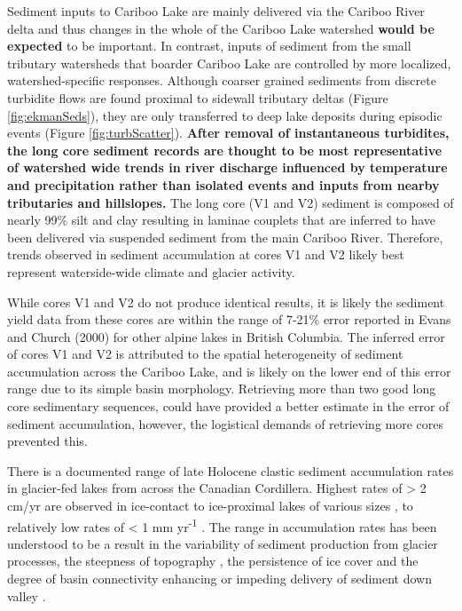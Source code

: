 \documentclass[Royal,times,doublespace,sageh]{sagej}
\begin{document}
Sediment inputs to Cariboo Lake are mainly delivered via the Cariboo
River delta and thus changes in the whole of the Cariboo Lake watershed
\textbf{would be expected} to be important. In contrast, inputs of
sediment from the small tributary watersheds that boarder Cariboo Lake
are controlled by more localized, watershed-specific responses. Although
coarser grained sediments from discrete turbidite flows are found
proximal to sidewall tributary deltas (Figure \ref{fig:ekmanSeds}), they
are only transferred to deep lake deposits during episodic events
(Figure \ref{fig:turbScatter}). \textbf{After removal of instantaneous
turbidites, the long core sediment records are thought to be most
representative of watershed wide trends in river discharge influenced by
temperature and precipitation rather than isolated events and inputs
from nearby tributaries and hillslopes.} The long core (V1 and V2)
sediment is composed of nearly 99\% silt and clay resulting in laminae
couplets that are inferred to have been delivered via suspended sediment
from the main Cariboo River. Therefore, trends observed in sediment
accumulation at cores V1 and V2 likely best represent waterside-wide
climate and glacier activity.

While cores V1 and V2 do not produce identical results, it is likely the
sediment yield data from these cores are within the range of 7-21\%
error reported in Evans and Church (2000) for other alpine lakes in
British Columbia. The inferred error of cores V1 and V2 is attributed to
the spatial heterogeneity of sediment accumulation across the Cariboo
Lake, and is likely on the lower end of this error range due to its
simple basin morphology. Retrieving more than two good long core
sedimentary sequences, could have provided a better estimate in the
error of sediment accumulation, however, the logistical demands of
retrieving more cores prevented this.

There is a documented range of late Holocene clastic sediment
accumulation rates in glacier-fed lakes from across the Canadian
Cordillera. Highest rates of \textgreater{} 2 cm/yr are observed in
ice-contact to ice-proximal lakes of various sizes
\citep{Desloges1994d, Crookshanks2008}, to relatively low rates of
\textless{} 1 mm yr\textsuperscript{-1} \citep{Gilbert2012}. The range
in accumulation rates has been understood to be a result in the
variability of sediment production from glacier processes, the steepness
of topography \citep{Ballantyne2002}, the persistence of ice cover and
the degree of basin connectivity enhancing or impeding delivery of
sediment down valley \citep{Wohl2019}.
\end{document}
